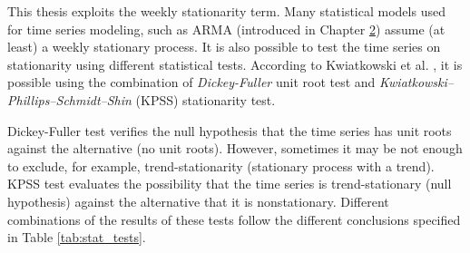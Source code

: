 
This thesis exploits the weekly stationarity term. Many statistical models used for time series modeling, such as ARMA (introduced in Chapter \hyperlink{ch2}{2}) assume (at least) a weekly stationary process. It is also possible to test the time series on stationarity using different statistical tests. According to Kwiatkowski et al. \cite{KWIATKOWSKI1992159}, it is possible using the combination of \textit{Dickey-Fuller} unit root test and \textit{Kwiatkowski–Phillips–Schmidt–Shin} (KPSS) stationarity test.

Dickey-Fuller test verifies the null hypothesis that the time series has unit roots against the alternative (no unit roots). However, sometimes it may be not enough to exclude, for example, trend-stationarity (stationary process with a trend). KPSS test evaluates the possibility that the time series is trend-stationary (null hypothesis) against the alternative that it is nonstationary. Different combinations of the results of these tests follow the different conclusions specified in Table \ref{tab:stat_tests}. 

